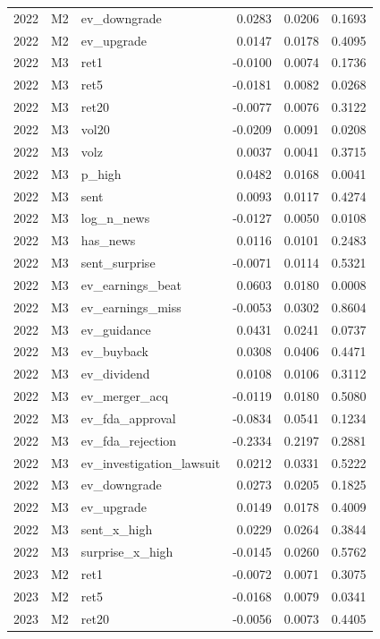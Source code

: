 \begin{tabular}{rllrrr}
2022 & M2 & ev\_downgrade & 0.0283 & 0.0206 & 0.1693 \\
2022 & M2 & ev\_upgrade & 0.0147 & 0.0178 & 0.4095 \\
2022 & M3 & ret1 & -0.0100 & 0.0074 & 0.1736 \\
2022 & M3 & ret5 & -0.0181 & 0.0082 & 0.0268 \\
2022 & M3 & ret20 & -0.0077 & 0.0076 & 0.3122 \\
2022 & M3 & vol20 & -0.0209 & 0.0091 & 0.0208 \\
2022 & M3 & volz & 0.0037 & 0.0041 & 0.3715 \\
2022 & M3 & p\_high & 0.0482 & 0.0168 & 0.0041 \\
2022 & M3 & sent & 0.0093 & 0.0117 & 0.4274 \\
2022 & M3 & log\_n\_news & -0.0127 & 0.0050 & 0.0108 \\
2022 & M3 & has\_news & 0.0116 & 0.0101 & 0.2483 \\
2022 & M3 & sent\_surprise & -0.0071 & 0.0114 & 0.5321 \\
2022 & M3 & ev\_earnings\_beat & 0.0603 & 0.0180 & 0.0008 \\
2022 & M3 & ev\_earnings\_miss & -0.0053 & 0.0302 & 0.8604 \\
2022 & M3 & ev\_guidance & 0.0431 & 0.0241 & 0.0737 \\
2022 & M3 & ev\_buyback & 0.0308 & 0.0406 & 0.4471 \\
2022 & M3 & ev\_dividend & 0.0108 & 0.0106 & 0.3112 \\
2022 & M3 & ev\_merger\_acq & -0.0119 & 0.0180 & 0.5080 \\
2022 & M3 & ev\_fda\_approval & -0.0834 & 0.0541 & 0.1234 \\
2022 & M3 & ev\_fda\_rejection & -0.2334 & 0.2197 & 0.2881 \\
2022 & M3 & ev\_investigation\_lawsuit & 0.0212 & 0.0331 & 0.5222 \\
2022 & M3 & ev\_downgrade & 0.0273 & 0.0205 & 0.1825 \\
2022 & M3 & ev\_upgrade & 0.0149 & 0.0178 & 0.4009 \\
2022 & M3 & sent\_x\_high & 0.0229 & 0.0264 & 0.3844 \\
2022 & M3 & surprise\_x\_high & -0.0145 & 0.0260 & 0.5762 \\
2023 & M2 & ret1 & -0.0072 & 0.0071 & 0.3075 \\
2023 & M2 & ret5 & -0.0168 & 0.0079 & 0.0341 \\
2023 & M2 & ret20 & -0.0056 & 0.0073 & 0.4405 \\

\end{tabular}
